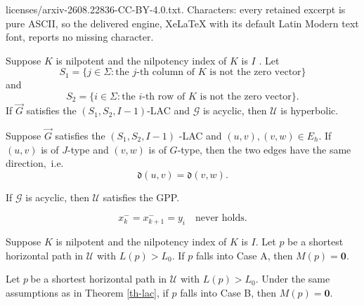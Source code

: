 \documentclass[10pt,a4paper]{amsart}
\begin{document}
licenses/arxiv-2608.22836-CC-BY-4.0.txt. Characters: every retained excerpt is pure ASCII, so the delivered engine, XeLaTeX with its default Latin Modern text font, reports no missing character.
\begin{theorem}
\label{th-lac}Suppose $K$ is nilpotent and the nilpotency index of $K$ is $I$%
. Let 
\begin{equation*}
S_{1}=\{j\in \Sigma :\text{the }j\text{-th column of }K\text{ is not the
zero vector}\}
\end{equation*}%
and 
\begin{equation*}
S_{2}=\{i\in \Sigma :\text{the }i\text{-th row of }K\text{ is not the zero
vector}\}.
\end{equation*}%
If $\overrightarrow{G}$ satisfies the $(S_{1},S_{2},I-1)$-LAC and $\mathcal{G%
}$ is acyclic, then $\mathcal{U}$ is hyperbolic.
\end{theorem}

\begin{claim}
\label{clm0}Suppose $\overrightarrow{G}$ satisfies the $(S_{1},S_{2},I-1)$%
-LAC and $(u,v),(v,w)\in E_{h}$. If $(u,v)$ is of $J$-type and $(v,w)$ is of 
$G$-type, then the two edges have the same direction$,$ i.e. 
\begin{equation*}
\mathfrak{d}(u,v)=\mathfrak{d}(v,w).
\end{equation*}
\end{claim}

\begin{lemma}
\label{le-GPP}If $\mathcal{G}$ is acyclic, then $\mathcal{U}$ satisfies the
GPP.
\end{lemma}

\begin{equation}
x_{k}^{-}=x_{k+1}^{-}=y_{i}\quad \text{never holds}.  \label{never}
\end{equation}

\begin{claim}
\label{clm1}Suppose $K$ is nilpotent and the nilpotency index of $K$ is $I$.
Let $p$ be a shortest horizontal path in $\mathcal{U}$ with $L(p)>L_{0}$. If 
$p$ falls into Case A, then $M(p)=\boldsymbol{0}.$
\end{claim}

\begin{claim}
\label{clm2}Let $p\ $be a shortest horizontal path in $\mathcal{U}$ with $%
L(p)>L_{0}$. Under the same assumptions as in Theorem \ref{th-lac}, if $p$
falls into Case B, then $M(p)=\boldsymbol{0}.$
\end{claim}
\end{document}
